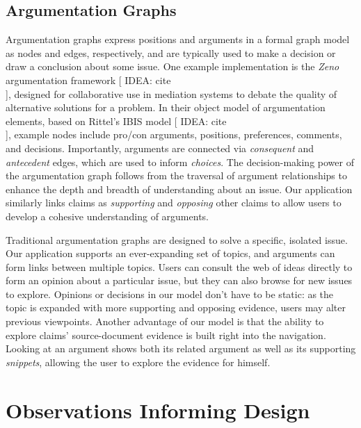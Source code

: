 \documentclass{chi2009}
\newcommand{\idea}[1]{{\color{blue} IDEA: #1}\\}
\begin{document}
\subsection{Argumentation Graphs}
Argumentation graphs express positions and arguments in a formal graph model as nodes and edges, respectively, and are typically used to make a decision or draw a conclusion about some issue. One example implementation is the {\it Zeno} argumentation framework [\idea{cite}], designed for collaborative use in mediation systems to debate the quality of alternative solutions for a problem. In their object model of argumentation elements, based on Rittel's IBIS model [\idea{cite}], example nodes include pro/con arguments, positions, preferences, comments, and decisions. Importantly, arguments are connected via {\it consequent} and {\it antecedent} edges, which are used to inform {\it choices}. The decision-making power of the argumentation graph follows from the traversal of argument relationships to enhance the depth and breadth of understanding about an issue. Our application similarly links claims as {\it supporting} and {\it opposing} other claims to allow users to develop a cohesive understanding of arguments.

Traditional argumentation graphs are designed to solve a specific, isolated issue. Our application supports an ever-expanding set of topics, and arguments can form links between multiple topics. Users can consult the web of ideas directly to form an opinion about a particular issue, but they can also browse for new issues to explore. Opinions or decisions in our model don't have to be static: as the topic is expanded with more supporting and opposing evidence, users may alter previous viewpoints. Another advantage of our model is that the ability to explore claims' source-document evidence is built right into the navigation. Looking at an argument shows both its related argument as well as its supporting {\it snippets}, allowing the user to explore the evidence for himself. 



\section{Observations Informing Design}
\end{document}
